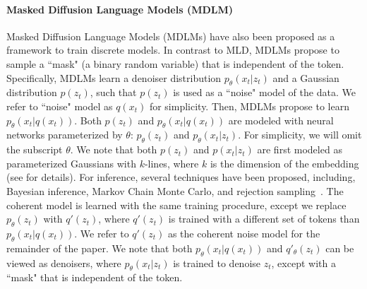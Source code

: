\documentclass{article} %
\begin{document}
\paragraph{Masked Diffusion Language Models (MDLM)}
Masked Diffusion Language Models (MDLMs) have also been proposed as a framework to train discrete models. In contrast to MLD, MDLMs propose to sample a ``mask" (a binary random variable) that is independent of the token. Specifically, MDLMs learn a denoiser distribution $p_\theta(x_t|z_t)$ and a Gaussian distribution $p(z_t)$, such that $p(z_t)$ is used as a ``noise" model of the data. We refer to ``noise" model as $q(x_t)$ for simplicity. Then, MDLMs propose to learn $p_\theta(x_t|q(x_t))$. Both $p(z_t)$ and $p_\theta(x_t|q(x_t))$ are modeled with neural networks parameterized by $\theta$: $p_\theta(z_t)$ and $p_\theta(x_t| z_t)$. For simplicity, we will omit the subscript $\theta$. We note that both $p(z_t)$ and $p(x_t|z_t)$ are first modeled as parameterized Gaussians with $k$-lines, where $k$ is the dimension of the embedding (see \citet{austin2023structured,shih2022training} for details). For inference, several techniques have been proposed, including, Bayesian inference, Markov Chain Monte Carlo, and rejection sampling~\citep{austin2023structured,shih2022training}. 
The coherent model is learned with the same training procedure, except we replace $p_\theta(z_t)$ with $q'(z_t)$, where $q'(z_t)$ is trained with a different set of tokens than $p_\theta(x_t|q(x_t))$. We refer to $q'(z_t)$ as the coherent noise model for the remainder of the paper. We note that both $p_\theta(x_t|q(x_t))$ and $q'_\theta(z_t)$ can be viewed as denoisers, where $p_\theta(x_t|z_t)$ is trained to denoise $z_t$, except with a ``mask" that is independent of the token. 
\end{document}
